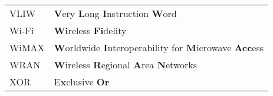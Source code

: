 \begin{center}
\begin{longtable}{ p{}  p{} }
		VLIW    & \textbf{V}ery \textbf{L}ong \textbf{I}nstruction \textbf{W}ord                                                  \\
		Wi-Fi   & \textbf{Wi}reless \textbf{Fi}delity                                                                             \\
		WiMAX   & \textbf{W}orldwide \textbf{I}nteroperability for \textbf{M}icrowave \textbf{Acc}ess                             \\
		WRAN    & \textbf{W}ireless \textbf{R}egional \textbf{A}rea \textbf{N}etworks                                             \\
		XOR     & E\textbf{x}clusive \textbf{Or}                                                                                  \\
	\end{longtable}
\end{center}